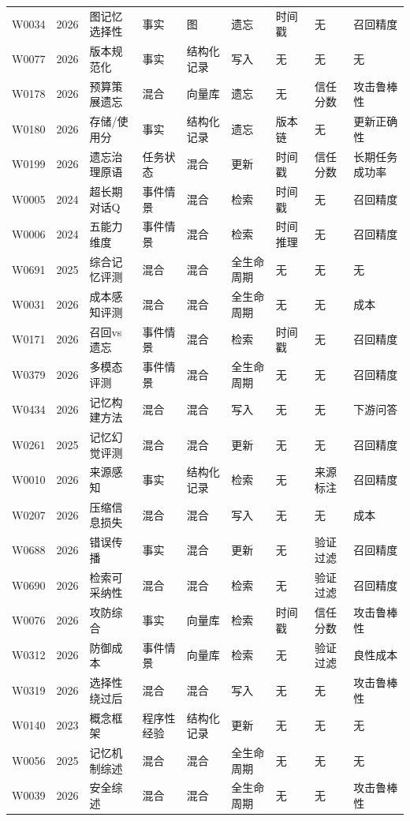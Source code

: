 \begin{small}
\begin{longtable}{p{1.0cm}p{0.5cm}p{1.8cm}p{1.4cm}p{1.4cm}p{1.3cm}p{1.2cm}p{1.2cm}p{1.4cm}}
W0034 & 2026 & 图记忆选择性 & 事实 & 图 & 遗忘 & 时间戳 & 无 & 召回精度 \\
W0077 & 2026 & 版本规范化 & 事实 & 结构化记录 & 写入 & 无 & 无 & 无 \\
W0178 & 2026 & 预算策展遗忘 & 混合 & 向量库 & 遗忘 & 无 & 信任分数 & 攻击鲁棒性 \\
W0180 & 2026 & 存储/使用分 & 事实 & 结构化记录 & 遗忘 & 版本链 & 无 & 更新正确性 \\
W0199 & 2026 & 遗忘治理原语 & 任务状态 & 混合 & 更新 & 时间戳 & 信任分数 & 长期任务成功率 \\
W0005 & 2024 & 超长期对话Q & 事件情景 & 混合 & 检索 & 时间戳 & 无 & 召回精度 \\
W0006 & 2024 & 五能力维度 & 事件情景 & 混合 & 检索 & 时间推理 & 无 & 召回精度 \\
W0691 & 2025 & 综合记忆评测 & 混合 & 混合 & 全生命周期 & 无 & 无 & 无 \\
W0031 & 2026 & 成本感知评测 & 混合 & 混合 & 全生命周期 & 无 & 无 & 成本 \\
W0171 & 2026 & 召回vs遗忘 & 事件情景 & 混合 & 检索 & 时间戳 & 无 & 召回精度 \\
W0379 & 2026 & 多模态评测 & 事件情景 & 混合 & 全生命周期 & 无 & 无 & 召回精度 \\
W0434 & 2026 & 记忆构建方法 & 混合 & 混合 & 写入 & 无 & 无 & 下游问答 \\
W0261 & 2025 & 记忆幻觉评测 & 混合 & 混合 & 更新 & 无 & 无 & 召回精度 \\
W0010 & 2026 & 来源感知 & 事实 & 结构化记录 & 检索 & 无 & 来源标注 & 召回精度 \\
W0207 & 2026 & 压缩信息损失 & 混合 & 混合 & 写入 & 无 & 无 & 成本 \\
W0688 & 2026 & 错误传播 & 事实 & 混合 & 更新 & 无 & 验证过滤 & 召回精度 \\
W0690 & 2026 & 检索可采纳性 & 混合 & 混合 & 检索 & 无 & 验证过滤 & 召回精度 \\
W0076 & 2026 & 攻防综合 & 事实 & 向量库 & 检索 & 时间戳 & 信任分数 & 攻击鲁棒性 \\
W0312 & 2026 & 防御成本 & 事件情景 & 向量库 & 检索 & 无 & 验证过滤 & 良性成本 \\
W0319 & 2026 & 选择性绕过后 & 混合 & 混合 & 写入 & 无 & 无 & 攻击鲁棒性 \\
W0140 & 2023 & 概念框架 & 程序性经验 & 结构化记录 & 更新 & 无 & 无 & 无 \\
W0056 & 2025 & 记忆机制综述 & 混合 & 混合 & 全生命周期 & 无 & 无 & 无 \\
W0039 & 2026 & 安全综述 & 混合 & 混合 & 全生命周期 & 无 & 无 & 攻击鲁棒性 \\
\end{longtable}
\end{small}
